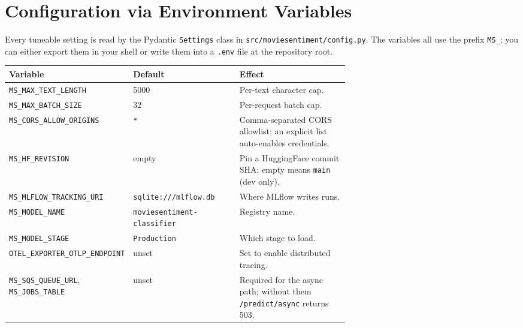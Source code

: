 \documentclass[11pt,a4paper]{article}
\begin{document}
\section{Configuration via Environment Variables}

Every tuneable setting is read by the Pydantic \texttt{Settings} class in
\texttt{src/moviesentiment/config.py}. The variables all use the prefix
\texttt{MS\_}; you can either export them in your shell or write them into a
\texttt{.env} file at the repository root.

\begin{longtable}{@{}lp{0.32\linewidth}p{0.34\linewidth}@{}}
\toprule
\textbf{Variable} & \textbf{Default} & \textbf{Effect} \\ \midrule \endhead
\texttt{MS\_MAX\_TEXT\_LENGTH}      & 5000          & Per-text character cap. \\
\texttt{MS\_MAX\_BATCH\_SIZE}       & 32            & Per-request batch cap. \\
\texttt{MS\_CORS\_ALLOW\_ORIGINS}   & \texttt{*}    & Comma-separated CORS allowlist;
                                                     an explicit list auto-enables
                                                     credentials. \\
\texttt{MS\_HF\_REVISION}           & empty         & Pin a HuggingFace commit SHA;
                                                     empty means \texttt{main}
                                                     (dev only). \\
\texttt{MS\_MLFLOW\_TRACKING\_URI}  & \texttt{sqlite:///mlflow.db} & Where MLflow
                                                                    writes runs. \\
\texttt{MS\_MODEL\_NAME}            & \texttt{moviesentiment-classifier} & Registry name. \\
\texttt{MS\_MODEL\_STAGE}           & \texttt{Production} & Which stage to load. \\
\texttt{OTEL\_EXPORTER\_OTLP\_ENDPOINT} & unset    & Set to enable distributed tracing. \\
\texttt{MS\_SQS\_QUEUE\_URL}, \texttt{MS\_JOBS\_TABLE} & unset & Required for the
                                                                async path; without
                                                                them \texttt{/predict/async}
                                                                returns 503. \\
\bottomrule
\end{longtable}
\end{document}
